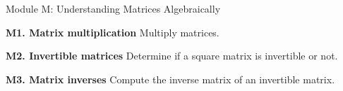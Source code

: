 
\begin{module}{Module M: Understanding Matrices Algebraically}

\begin{moduleStandards}
  \item \textbf{M1. Matrix multiplication}
         Multiply matrices.
  \item \textbf{M2. Invertible matrices}
        Determine if a square matrix is invertible or not.
  \item \textbf{M3. Matrix inverses}
        Compute the inverse matrix of an invertible matrix.
\end{moduleStandards}







\end{module}